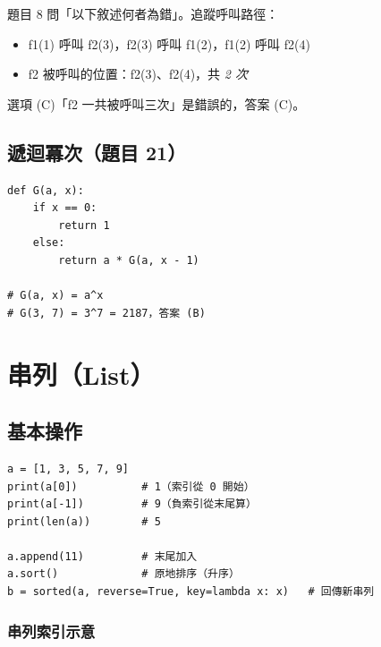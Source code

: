 \documentclass[12pt, a4paper]{ctexart}
\begin{document}
題目 8 問「以下敘述何者為錯」。追蹤呼叫路徑：

\begin{itemize}[itemsep=1pt, topsep=3pt, leftmargin=1.5em]
  \item f1(1) 呼叫 f2(3)，f2(3) 呼叫 f1(2)，f1(2) 呼叫 f2(4)
  \item f2 被呼叫的位置：f2(3)、f2(4)，共 \textit{2 次}
\end{itemize}

選項 (C)「f2 一共被呼叫三次」是錯誤的，答案 (C)。

\subsection{遞迴冪次（題目 21）}

\begin{verbatim}
def G(a, x):
    if x == 0:
        return 1
    else:
        return a * G(a, x - 1)

# G(a, x) = a^x
# G(3, 7) = 3^7 = 2187，答案 (B)
\end{verbatim}

\section{串列（List）}

\subsection{基本操作}

\begin{verbatim}
a = [1, 3, 5, 7, 9]
print(a[0])          # 1（索引從 0 開始）
print(a[-1])         # 9（負索引從末尾算）
print(len(a))        # 5

a.append(11)         # 末尾加入
a.sort()             # 原地排序（升序）
b = sorted(a, reverse=True, key=lambda x: x)   # 回傳新串列
\end{verbatim}

\subsubsection*{串列索引示意}

\begin{center}
\end{center}
\end{document}

